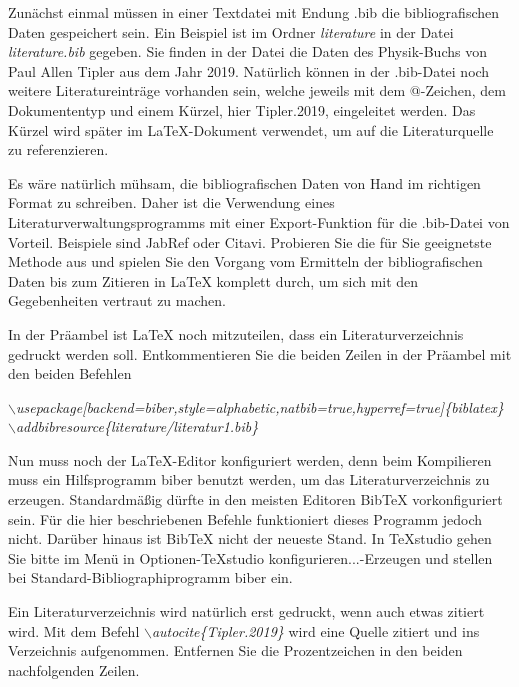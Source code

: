\documentclass[ngerman]{book}	%
\begin{document}
Zunächst einmal müssen in einer Textdatei mit Endung .bib die bibliografischen Daten gespeichert sein. Ein Beispiel ist im Ordner \textit{literature} in der Datei \textit{literature.bib} gegeben. Sie finden in der Datei die Daten des Physik-Buchs von Paul Allen Tipler aus dem Jahr 2019. Natürlich können in der .bib-Datei noch weitere Literatureinträge vorhanden sein, welche jeweils mit dem {@}-Zeichen, dem Dokumententyp und einem Kürzel, hier \glqq Tipler.2019\grqq , eingeleitet werden. Das Kürzel wird später im \LaTeX-Dokument verwendet, um auf die Literaturquelle zu referenzieren.

Es wäre natürlich mühsam, die bibliografischen Daten von Hand im richtigen Format zu schreiben. Daher ist die Verwendung eines Literaturverwaltungsprogramms mit einer Export-Funktion für die .bib-Datei von Vorteil. Beispiele sind JabRef oder Citavi. Probieren Sie die für Sie geeignetste Methode aus und spielen Sie den Vorgang vom Ermitteln der bibliografischen Daten bis zum Zitieren in \LaTeX\; komplett durch, um sich mit den Gegebenheiten vertraut zu machen.

In der Präambel ist \LaTeX\; noch mitzuteilen, dass ein Literaturverzeichnis gedruckt werden soll. Entkommentieren Sie die beiden Zeilen in der Präambel mit den beiden Befehlen

\textit{$\backslash$usepackage[backend=biber,style=alphabetic,natbib=true,hyperref=true]\{biblatex\}}\\
\textit{$\backslash$addbibresource\{literature/literatur1.bib\}}
%

Nun muss noch der \LaTeX-Editor konfiguriert werden, denn beim Kompilieren muss ein Hilfsprogramm \glqq biber\grqq\; benutzt werden, um das Literaturverzeichnis zu erzeugen. Standardmäßig dürfte in den meisten Editoren \glqq BibTeX\grqq\; vorkonfiguriert sein. Für die hier beschriebenen Befehle funktioniert dieses Programm jedoch nicht. Darüber hinaus ist \glqq BibTeX\grqq\; nicht der neueste Stand. In TeXstudio gehen Sie bitte im Menü in Optionen-TeXstudio konfigurieren...-Erzeugen und stellen bei Standard-Bibliographiprogramm \glqq biber\grqq\; ein.

Ein Literaturverzeichnis wird natürlich erst gedruckt, wenn auch etwas zitiert wird. Mit dem Befehl \textit{$\backslash$autocite\{Tipler.2019\}} wird eine Quelle zitiert und ins Verzeichnis aufgenommen. Entfernen Sie die Prozentzeichen in den beiden nachfolgenden Zeilen.
\end{document}

